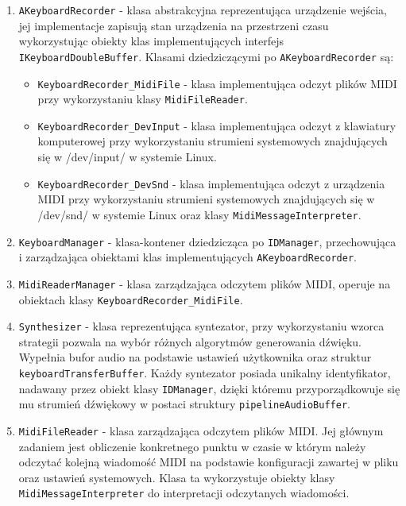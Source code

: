 \begin{enumerate}
    \item \texttt{AKeyboardRecorder} - klasa abstrakcyjna reprezentująca urządzenie wejścia, jej implementacje zapisują stan urządzenia na przestrzeni czasu wykorzystując obiekty klas implementujących interfejs \texttt{IKeyboardDoubleBuffer}. Klasami dziedziczącymi po \texttt{AKeyboardRecorder} są:
    \begin{itemize}
        \item \texttt{KeyboardRecorder\_MidiFile} - klasa implementująca odczyt plików MIDI przy wykorzystaniu klasy \texttt{MidiFileReader}.
        \item \texttt{KeyboardRecorder\_DevInput} - klasa implementująca odczyt z klawiatury komputerowej przy wykorzystaniu strumieni systemowych znajdujących się w /dev/input/\cite{bib:system-streem} w systemie Linux.
        \item \texttt{KeyboardRecorder\_DevSnd} - klasa implementująca odczyt z urządzenia MIDI przy wykorzystaniu strumieni systemowych znajdujących się w /dev/snd/\cite{bib:system-streem} w systemie Linux oraz klasy \texttt{MidiMessageInterpreter}.
    \end{itemize}
    \item \texttt{KeyboardManager} - klasa-kontener dziedzicząca po \texttt{IDManager}, przechowująca i zarządzająca obiektami klas implementujących \texttt{AKeyboardRecorder}.
    \item \texttt{MidiReaderManager} - klasa zarządzająca odczytem plików MIDI, operuje na  obiektach klasy \texttt{KeyboardRecorder\_MidiFile}.
    \item \texttt{Synthesizer} - klasa reprezentująca syntezator, przy wykorzystaniu wzorca strategii\cite{bib:DesignPatterns} pozwala na wybór różnych algorytmów generowania dźwięku. Wypełnia bufor audio na podstawie ustawień użytkownika oraz struktur \texttt{keyboardTransferBuffer}. Każdy syntezator posiada unikalny identyfikator, nadawany przez obiekt klasy \texttt{IDManager}, dzięki któremu przyporządkowuje się mu strumień dźwiękowy w postaci struktury \texttt{pipelineAudioBuffer}.
    \item \texttt{MidiFileReader} - klasa zarządzająca odczytem plików MIDI. Jej głównym zadaniem jest obliczenie konkretnego punktu w czasie w którym należy odczytać kolejną wiadomość MIDI na podstawie konfiguracji zawartej w pliku oraz ustawień systemowych. Klasa ta wykorzystuje obiekty klasy \texttt{MidiMessageInterpreter} do interpretacji odczytanych wiadomości.
\end{enumerate}


